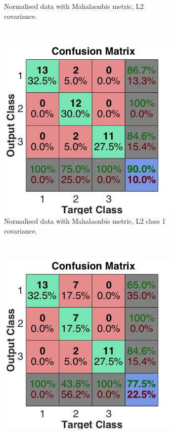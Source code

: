 \documentclass[a4paper, 10pt, conference]{ieeeconf}
\begin{document}
\begin{figure}[!ht]
\begin{subfigure}{0.32\textwidth}
      \caption{Normalised data with Mahalaonbis metric, L2 covariance.}
    \end{subfigure}
    \\
    \begin{subfigure}{0.32\textwidth}
      \includegraphics[width=\textwidth]{pic/mod_cov_l2_class1.png}
      \caption{Normalised data with Mahalaonbis metric, L2 class 1 covariance.}
    \end{subfigure}
    ~
    \begin{subfigure}{0.32\textwidth}
      \includegraphics[width=\textwidth]{pic/mod_cov_l2_class2.png}

\end{subfigure}
\end{figure}
\end{document}
